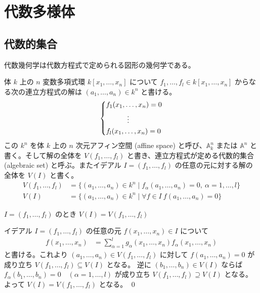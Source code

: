 \documentclass[uplatex,dvipdfmx,a4paper,11pt]{jlreq}
\title{}
\author{anko9801}
\makeatletter
\renewcommand{\AA}{\mathbb{A}}
\numberwithin{equation}{section}
\theoremstyle{definition}
\renewenvironment{proof}[1][\proofname]{\par
  \normalfont
  \topsep6\p@\@plus6\p@ \trivlist
  \item[\hskip\labelsep{\bfseries #1}\@addpunct{\bfseries}]\ignorespaces\quad\par
}{%
  \qed\endtrivlist\@endpefalse
}
\renewcommand\proofname{証明}
\makeatother
\begin{document}
\maketitle
\tableofcontents
\clearpage

\section{代数多様体}
\subsection{代数的集合}
代数幾何学は代数方程式で定められる図形の幾何学である。
\begin{definition}
  体 $k$ 上の $n$ 変数多項式環 $k[x_1,\ldots,x_n]$ について $f_1,\ldots,f_l\in k[x_1,\ldots,x_n]$ からなる次の連立方程式の解は $(a_1,\ldots,a_n)\in k^n$ と書ける。
  \begin{align}
    \begin{dcases}
      f_1(x_1,\ldots,x_n) = 0 \\
      \quad\qquad \vdots      \\
      f_l(x_1,\ldots,x_n) = 0
    \end{dcases}
  \end{align}
  この $k^n$ を体 $k$ 上の $n$ 次元アフィン空間 (affine space) と呼び、$\AA_k^n$ または $\AA^n$ と書く。そして解の全体を $V(f_1,\ldots,f_l)$ と書き、連立方程式が定める代数的集合 (algebraic set) と呼ぶ。またイデアル $I = (f_1,\ldots,f_l)$ の任意の元に対する解の全体を $V(I)$ と書く。
  \begin{align}
    V(f_1, \ldots, f_l) & = \lbrace(a_1, \ldots, a_n)\in k^n\mid f_\alpha(a_1,\ldots,a_n) = 0,\ \alpha = 1,\ldots,l\rbrace \\
    V(I)                & = \lbrace(a_1, \ldots, a_n)\in k^n\mid \forall f\in I \ f(a_1,\ldots,a_n) = 0\rbrace
  \end{align}
\end{definition}

\begin{lemma}
  $I = (f_1,\ldots,f_l)$ のとき $V(I) = V(f_1,\ldots,f_l)$
\end{lemma}
\begin{proof}
  イデアル $I = (f_1,\ldots,f_l)$ の任意の元 $f(x_1,\ldots,x_n)\in I$ について
  \begin{align}
    f(x_1,\ldots,x_n) & = \sum_{\alpha=1}^{l}g_\alpha(x_1,\ldots,x_n)f_\alpha(x_1,\ldots,x_n)
  \end{align}
  と書ける。これより $(a_1,\ldots,a_n)\in V(f_1,\ldots,f_l)$ に対して $f(a_1,\ldots,a_n) = 0$ が成り立ち $V(f_1,\ldots,f_l)\subseteq V(I)$ となる。
  逆に $(b_1,\ldots,b_n)\in V(I)$ ならば $f_\alpha(b_1,\ldots,b_n) = 0\quad (\alpha = 1,\ldots,l)$ が成り立ち $V(f_1,\ldots,f_l)\supseteq V(I)$ となる。
  よって $V(I) = V(f_1,\ldots,f_l)$ となる。
\end{proof}
\end{document}
